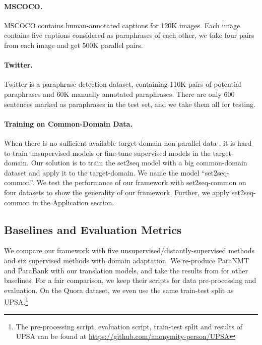 \paragraph{MSCOCO. } MSCOCO \citep{lin2014microsoft} contains human-annotated captions for 120K images. Each image contains five captions considered as paraphrases of each other, we take four pairs from each image and get 500K parallel pairs.

\paragraph{Twitter. } Twitter \citep{lan2017continuously} is a paraphrase detection dataset, containing 110K pairs of potential paraphrases and 60K manually annotated paraphrases. There are only 600 sentences marked as paraphrases in the test set, and we take them all for testing.

\paragraph{Training on Common-Domain Data. } \label{sec:indomain}
When there is no sufficient available target-domain non-parallel data
, it is hard to train unsupervised models or fine-tune supervised models in the target-domain. Our solution is to train the set2seq model with a big common-domain dataset and apply it to the target-domain. We name the model ``set2seq-common''. We test the performance of our framework with set2seq-common on four datasets to show the generality of our framework. Further, we apply set2seq-common in the Application section.

\subsection{Baselines and Evaluation Metrics}
We compare our framework with five unsupervised/distantly-supervised methods and six supervised methods with domain adaptation. We re-produce ParaNMT and ParaBank with our translation models, and take the results from \citet{liu2019unsupervised} for other baselines. For a fair comparison, we keep their scripts for data pre-processing and evaluation. On the Quora dataset, we even use the same train-test split as UPSA.\footnote{The pre-processing script, evaluation script, train-test split and results of UPSA can be found at \url{https://github.com/anonymity-person/UPSA}}

